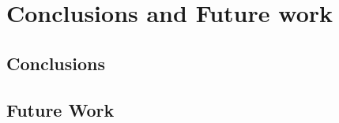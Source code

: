 \chapter{Conclusions and Future work} \label{chap:conclusions}

\section{Conclusions}
\section{Future Work}